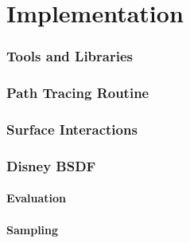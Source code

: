 \chapter{Implementation}

\subsection{Tools and Libraries}

\subsection{Path Tracing Routine}

\subsection{Surface Interactions}

\subsection{Disney BSDF}

\subsubsection*{Evaluation}

\subsubsection*{Sampling}